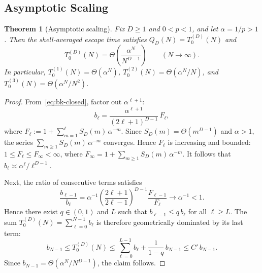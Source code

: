 \documentclass[conference]{IEEEtran}
\DeclareRobustCommand{\revadd}[1]{{\color{revisionblue}#1}}
\newtheorem{theorem}{Theorem}
\begin{document}

\subsection{Asymptotic Scaling}

\begin{theorem}[Asymptotic scaling]
\label{thm:asymptotic}
Fix $D \ge 1$ and $0<p<1$, and let $\alpha = 1/p > 1$.
Then the shell-averaged escape time satisfies
$Q_D(N)=T_0^{(D)}(N)$ and
\begin{equation}
\label{eq:theta-scaling}
T_0^{(D)}(N) = \Theta\!\left(\frac{\alpha^N}{N^{D-1}}\right)
\qquad (N \to \infty).
\end{equation}
In particular,
$T_0^{(1)}(N) = \Theta(\alpha^N)$,
$T_0^{(2)}(N) = \Theta(\alpha^N/N)$, and
$T_0^{(3)}(N) = \Theta(\alpha^N/N^2)$.
\end{theorem}

\begin{proof}
From~\eqref{eq:bk-closed}, factor out $\alpha^{\ell+1}$:
\begin{equation}
\label{eq:bell-factored}
b_\ell = \frac{\alpha^{\ell+1}}{(2\ell+1)^{D-1}}\,F_\ell,
\end{equation}
where
$F_\ell := 1 + \sum_{m=1}^{\ell} S_D(m)\,\alpha^{-m}$.
Since $S_D(m) = \Theta(m^{D-1})$ and $\alpha > 1$, the series
$\sum_{m \ge 1} S_D(m)\,\alpha^{-m}$
converges.
Hence $F_\ell$ is increasing and bounded:
$1 \le F_\ell \le F_\infty < \infty$, where
$F_\infty = 1 + \sum_{m \ge 1} S_D(m)\,\alpha^{-m}$.
It follows that $b_\ell \asymp \alpha^\ell / \ell^{D-1}$.

Next, the ratio of consecutive terms satisfies
\[
\frac{b_{\ell-1}}{b_\ell}
= \alpha^{-1}\left(\frac{2\ell+1}{2\ell-1}\right)^{D-1}
  \frac{F_{\ell-1}}{F_\ell}
\longrightarrow \alpha^{-1} < 1.
\]
Hence there exist $q \in (0,1)$ and $L$ such that
$b_{\ell-1} \le q\,b_\ell$ for all $\ell \ge L$.
The sum $T_0^{(D)}(N) = \sum_{\ell=0}^{N-1} b_\ell$ is therefore
geometrically dominated by its last term:
\[
b_{N-1} \le T_0^{(D)}(N)
\le \sum_{\ell=0}^{L-1} b_\ell + \frac{1}{1-q}\,b_{N-1}
\le C'\,b_{N-1}.
\]
Since $b_{N-1} = \Theta(\alpha^N / N^{D-1})$, the claim follows.
\end{proof}
\end{document}
